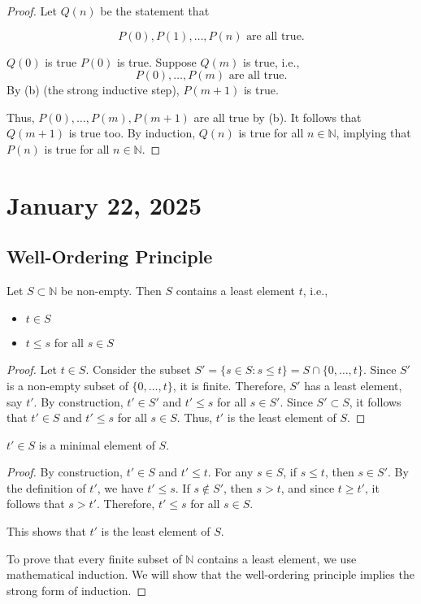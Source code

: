 \documentclass[11pt, draft]{article}
\begin{document}
\begin{proof} Let $Q(n)$ be the statement that

    \[
        P(0), P(1), \ldots, P(n) \text{ are all true.}
    \]

    $Q(0)$ is true $P(0)$ is true.
    Suppose $Q(m)$ is true, i.e.,
    \[
        P(0), \ldots, P(m) \text{ are all true.}
    \]
    By (b) (the strong inductive step), $P(m+1)$ is true.

    Thus, $P(0), \ldots, P(m), P(m+1)$ are all true by (b). It follows that
    $Q(m+1)$ is true too. By induction, $Q(n)$ is true for all $n \in \mathbb{N}$,
    implying that $P(n)$ is true for all $n \in \mathbb{N}$.
\end{proof}

\section{January 22, 2025}
\subsection{Well-Ordering Principle}
\begin{theorem} 
    Let $S \subset \mathbb{N}$ be non-empty. Then $S$ contains a least element $t$, i.e.,
    \begin{itemize}
        \item $t \in S$
        \item $t \leq s$ for all $s \in S$
    \end{itemize}
\end{theorem}

\begin{proof}
    Let $t \in S$. Consider the subset $S' = \{ s \in S : s \leq t \} = S \cap \{0, \ldots, t\}$. Since $S'$ is a non-empty subset of $\{0, \ldots, t\}$, it is finite. Therefore, $S'$ has a least element, say $t'$. By construction, $t' \in S'$ and $t' \leq s$ for all $s \in S'$. Since $S' \subset S$, it follows that $t' \in S$ and $t' \leq s$ for all $s \in S$. Thus, $t'$ is the least element of $S$.
\end{proof}
\begin{corollary}
    $t' \in S$ is a minimal element of $S$.
\end{corollary}

\begin{proof}
    By construction, $t' \in S$ and $t' \leq t$. For any $s \in S$, if $s \leq t$, then $s \in S'$. By the definition of $t'$, we have $t' \leq s$. If $s \notin S'$, then $s > t$, and since $t \geq t'$, it follows that $s > t'$. Therefore, $t' \leq s$ for all $s \in S$.

    This shows that $t'$ is the least element of $S$.

    To prove that every finite subset of $\mathbb{N}$ contains a least element, we
    use mathematical induction. We will show that the well-ordering principle
    implies the strong form of induction.
\end{proof}
\end{document}
